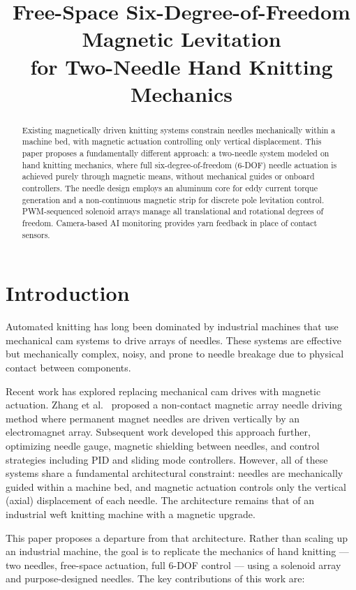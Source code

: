\documentclass[12pt, a4paper]{article}
\title{\textbf{Free-Space Six-Degree-of-Freedom Magnetic Levitation\\for Two-Needle Hand Knitting Mechanics}}
\date{}
\begin{document}
\maketitle

\begin{abstract}
Existing magnetically driven knitting systems constrain needles mechanically
within a machine bed, with magnetic actuation controlling only vertical
displacement. This paper proposes a fundamentally different approach: a
two-needle system modeled on hand knitting mechanics, where full six-degree-of-freedom
(6-DOF) needle actuation is achieved purely through magnetic means, without
mechanical guides or onboard controllers. The needle design employs an aluminum
core for eddy current torque generation and a non-continuous magnetic strip for
discrete pole levitation control. PWM-sequenced solenoid arrays manage all
translational and rotational degrees of freedom. Camera-based AI monitoring
provides yarn feedback in place of contact sensors.
\end{abstract}

\section{Introduction}

Automated knitting has long been dominated by industrial machines that use
mechanical cam systems to drive arrays of needles. These systems are effective
but mechanically complex, noisy, and prone to needle breakage due to physical
contact between components.

Recent work has explored replacing mechanical cam drives with magnetic actuation.
Zhang et al.\ \cite{zhang2019} proposed a non-contact magnetic array needle driving
method where permanent magnet needles are driven vertically by an electromagnet
array. Subsequent work \cite{zuo2021, xiong2023, zhang2025} developed this approach
further, optimizing needle gauge, magnetic shielding between needles, and control
strategies including PID and sliding mode controllers. However, all of these systems
share a fundamental architectural constraint: needles are mechanically guided within
a machine bed, and magnetic actuation controls only the vertical (axial) displacement
of each needle. The architecture remains that of an industrial weft knitting machine
with a magnetic upgrade.

This paper proposes a departure from that architecture. Rather than scaling up an
industrial machine, the goal is to replicate the mechanics of hand knitting --- two
needles, free-space actuation, full 6-DOF control --- using a solenoid array and
purpose-designed needles. The key contributions of this work are:
\end{document}
